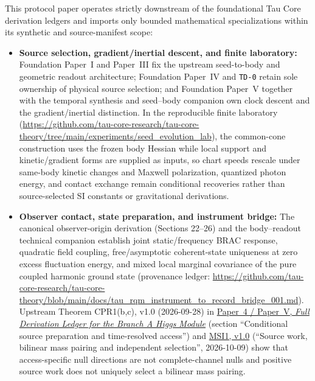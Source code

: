 \documentclass[11pt]{article}
\begin{document}
This protocol paper operates strictly downstream of the foundational Tau Core
derivation ledgers and imports only bounded mathematical specializations within
its synthetic and source-manifest scope:
\begin{itemize}
  \item \textbf{Source selection, gradient/inertial descent, and finite laboratory:}
  Foundation Paper~I and Paper~III fix the upstream seed-to-body and geometric
  readout architecture; Foundation Paper~IV and \texttt{TD-0} retain sole
  ownership of physical source selection; and Foundation Paper~V together with
  the temporal synthesis and seed--body companion own clock descent and the
  gradient/inertial distinction.  In the reproducible finite laboratory
  (\url{https://github.com/tau-core-research/tau-core-theory/tree/main/experiments/seed_evolution_lab}),
  the common-cone construction uses the frozen body Hessian while local support
  and kinetic/gradient forms are supplied as inputs, so chart speeds rescale
  under same-body kinetic changes and Maxwell polarization, quantized photon
  energy, and contact exchange remain conditional recoveries rather than
  source-selected SI constants or gravitational derivations.

  \item \textbf{Observer contact, state preparation, and instrument bridge:}
  The canonical observer-origin derivation (Sections 22--26) and the
  body--readout technical companion establish joint static/frequency BRAC
  response, quadratic field coupling, free/asymptotic coherent-state uniqueness
  at zero excess fluctuation energy, and mixed local marginal covariance of the
  pure coupled harmonic ground state (provenance ledger:
  \url{https://github.com/tau-core-research/tau-core-theory/blob/main/docs/tau_rqm_instrument_to_record_bridge_001.md}).
  Upstream Theorem CPR1(b,c), v1.0 (2026-09-28) in
  \href{https://github.com/tau-core-research/tau-core-higgs-module-paper4/blob/main/paper4_full_derivation/full_derivation.pdf#nameddest=cpr1}{Paper~4 / Paper~V, \emph{Full Derivation Ledger for the Branch A Higgs Module}}
  (section ``Conditional source preparation and time-resolved access'') and
  \href{https://github.com/tau-core-research/tau-core-higgs-module-paper4/blob/main/paper4_full_derivation/full_derivation.pdf#nameddest=msi1}{MSI1, v1.0}
  (``Source work, bilinear mass pairing and independent selection'', 2026-10-09)
  show that access-specific null directions are not complete-channel nulls and
  positive source work does not uniquely select a bilinear mass pairing.


\end{itemize}
\end{document}
